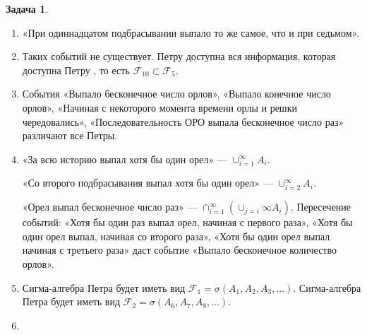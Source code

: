 \documentclass[pdftex, 12pt, a4paper]{article}
\def\F{\ensuremath{\mathcal{F}}} %
\def \sg{\sigma}
\theoremstyle{definition} %
\newtheorem{problem}{Задача}
\numberwithin{problem}{section}
\numberwithin{blits}{section}
\newcommand{\RNumb}[1]{\uppercase\expandafter{\romannumeral #1\relax}}
\begin{document}
\begin{problem}
\begin{sol}
\begin{enumerate}
\item «При одиннадцатом подбрасывании выпало то же самое, что и при седьмом».

\item Таких событий не существует. Петру \RNumb{5} доступна вся информация, которая доступна Петру \RNumb{10}, то есть $\F_{10} \subset \F_5$.

\item События «Выпало бесконечное число орлов», «Выпало конечное число орлов», «Начиная с некоторого момента времени орлы и решки чередовались», «Последовательность ОРО выпала бесконечное число раз» различают все Петры.

\item «За всю историю выпал хотя бы один орел» --- $\cup_{i=1}^{\infty} A_i$.

«Со второго подбрасывания выпал хотя бы один орел» --- $\cup_{i=2}^{\infty} A_i$.

«Орел выпал бесконечное число раз» --- $\cap_{i=1}^{\infty} (\cup_{j=i}{\infty} A_i)$. Пересечение событий: «Хотя бы один раз выпал орел, начиная с первого раза», «Хотя бы один орел выпал, начиная со второго раза», «Хотя бы один орел выпал начиная с третьего раза» даст событие «Выпало бесконечное количество орлов».

\item Сигма-алгебра Петра \RNumb{1} будет иметь вид $\F_1 =\sg(A_1,A_2,A_3, \dots)$. Сигма-алгебра Петра \RNumb{6} будет иметь вид $\F_2 = \sg(A_6,A_7,A_8, \dots)$.

\item 

\end{enumerate}

\end{sol}
\end{problem}
\end{document}
